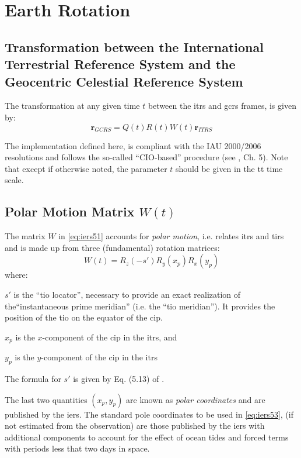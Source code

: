 \section{Earth Rotation}

\subsection{Transformation between the International Terrestrial Reference System and the Geocentric Celestial Reference System}
\label{sec:itrs-to-gcrs}

The transformation at any given time $t$ between the \gls{itrs} and \gls{gcrs} 
frames, is given by:
\begin{equation}\label{eq:iers51}
  \bm{r}_{GCRS} = Q(t) R(t) W(t) \bm{r}_{ITRS}
\end{equation}

The implementation defined here, is compliant with the IAU 2000/2006 resolutions and 
follows the so-called ``CIO-based'' procedure (see \cite{iers2010}, Ch. 5).
Note that except if otherwise noted, the parameter $t$ should be given in the 
\gls{tt} time scale.

\subsection{Polar Motion Matrix $W(t)$}\label{ssec:polar-motion-matrix}
The matrix $W$ in \autoref{eq:iers51} accounts for \emph{polar motion}, i.e. relates 
\gls{itrs} and \gls{tirs} and is made up from three (fundamental) rotation matrices:
\begin{equation}\label{eq:iers53}
  W(t) = R_z (-s') R_y (x_{p}) R_x (y_{p})
\end{equation}
where:
\begin{description}
  \item $s'$ is the ``\gls{tio} locator'', necessary to provide an exact realization 
    of the``instantaneous prime meridian'' (i.e. the ``\gls{tio} meridian''). It provides 
    the position of the \gls{tio} on the equator of the \gls{cip}.
  \item $x_p$ is the $x$-component of the \gls{cip} in the \gls{itrs}, and
  \item $y_p$ is the $y$-component of the \gls{cip} in the \gls{itrs}
\end{description}

The formula for $s'$ is given by Eq. (5.13) of \cite{iers2010}.

The last two quantities $(x_p , y_p)$ are known as \emph{polar coordinates} and are 
published by the \gls{iers}. The standard pole coordinates to be used in \autoref{eq:iers53}, 
(if not estimated from the observation) are those published by the \gls{iers} with
additional components to account for the effect of ocean tides and forced terms 
with periods less that two days in space.

